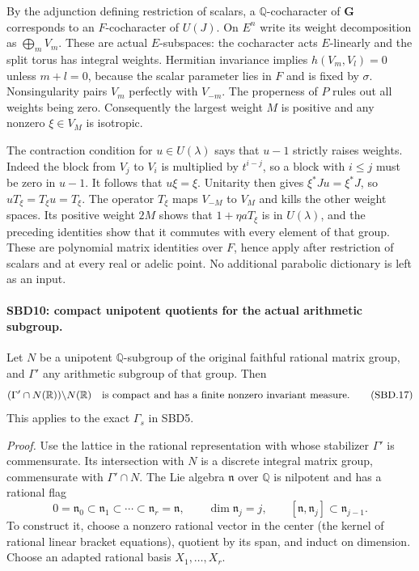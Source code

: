 \documentclass[11pt,a4paper]{article}
\numberwithin{equation}{section}
\theoremstyle{remark}\newtheorem{remark}[theorem]{Remark}
\begin{document}
By the adjunction defining restriction of scalars, a
\(\mathbb Q\)-cocharacter of \(\mathbf G\) corresponds to an
\(F\)-cocharacter of \(U(J)\).  On \(E^n\) write its weight
decomposition as \(\bigoplus_m V_m\).  These are actual
\(E\)-subspaces: the cocharacter acts \(E\)-linearly and the
split torus has integral weights.  Hermitian invariance implies
\(h(V_m,V_l)=0\) unless \(m+l=0\), because the scalar
parameter lies in \(F\) and is fixed by \(\sigma\).
Nonsingularity pairs \(V_m\) perfectly with \(V_{-m}\).
The properness of \(P\) rules out all weights being zero.
Consequently the largest weight \(M\) is positive and any
nonzero \(\xi\in V_M\) is isotropic.

The contraction condition for \(u\in U(\lambda)\) says that
\(u-1\) strictly raises weights.  Indeed the block from
\(V_j\) to \(V_i\) is multiplied by \(t^{i-j}\), so a block
with \(i\le j\) must be zero in \(u-1\).  It follows that
\(u\xi=\xi\).  Unitarity then gives
\(\xi^*Ju=\xi^*J\), so \(uT_\xi=T_\xi u=T_\xi\).
The operator \(T_\xi\) maps \(V_{-M}\) to \(V_M\) and
kills the other weight spaces.  Its positive weight \(2M\)
shows that \(1+\eta aT_\xi\) is in \(U(\lambda)\), and
the preceding identities show that it commutes with every
element of that group.  These are polynomial matrix identities
over \(F\), hence apply after restriction of scalars and at
every real or adelic point.  No additional parabolic dictionary
is left as an input.

\paragraph{SBD10: compact unipotent quotients for the actual arithmetic subgroup.}
\label{claim:SBD10}
Let \(N\) be a unipotent \(\mathbb Q\)-subgroup of the original
faithful rational matrix group, and \(\Gamma'\) any arithmetic
subgroup of that group.  Then
\[
 (\Gamma'\cap N(\mathbb R))\backslash N(\mathbb R)
 \quad\hbox{is compact and has a finite nonzero invariant measure.}
 \tag{SBD.17}
\]
This applies to the exact \(\Gamma_s\) in SBD5.

\emph{Proof.}
Use the lattice in the rational representation with whose
stabilizer \(\Gamma'\) is commensurate.  Its intersection with
\(N\) is a discrete integral matrix group, commensurate with
\(\Gamma'\cap N\).  The Lie algebra \(\mathfrak n\) over
\(\mathbb Q\) is nilpotent and has a rational flag
\[
 0=\mathfrak n_0\subset\mathfrak n_1\subset\cdots
  \subset\mathfrak n_r=\mathfrak n,\qquad
 \dim\mathfrak n_j=j,\qquad
 [\mathfrak n,\mathfrak n_j]\subset\mathfrak n_{j-1}.
 \tag{SBD.18}
\]
To construct it, choose a nonzero rational vector in the center
(the kernel of rational linear bracket equations), quotient by
its span, and induct on dimension.  Choose an adapted rational
basis \(X_1,\ldots,X_r\).
\end{document}
